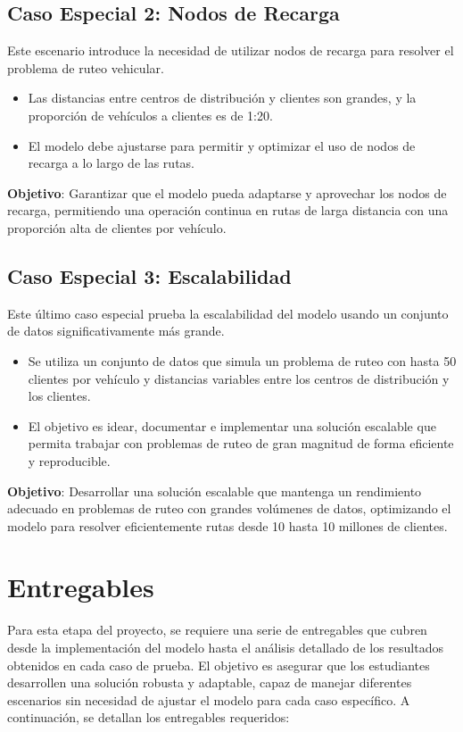 \documentclass[12pt]{article}
\begin{document}
\subsection{Caso Especial 2: Nodos de Recarga}
Este escenario introduce la necesidad de utilizar nodos de recarga para resolver el problema de ruteo vehicular.
\begin{itemize}
    \item Las distancias entre centros de distribución y clientes son grandes, y la proporción de vehículos a clientes es de 1:20.
    \item El modelo debe ajustarse para permitir y optimizar el uso de nodos de recarga a lo largo de las rutas.
\end{itemize}
\textbf{Objetivo}: Garantizar que el modelo pueda adaptarse y aprovechar los nodos de recarga, permitiendo una operación continua en rutas de larga distancia con una proporción alta de clientes por vehículo.

\subsection{Caso Especial 3: Escalabilidad}
Este último caso especial prueba la escalabilidad del modelo usando un conjunto de datos significativamente más grande.
\begin{itemize}
    \item Se utiliza un conjunto de datos que simula un problema de ruteo con hasta 50 clientes por vehículo y distancias variables entre los centros de distribución y los clientes.
    \item El objetivo es idear, documentar e implementar una solución escalable que permita trabajar con problemas de ruteo de gran magnitud de forma eficiente y reproducible.
\end{itemize}
\textbf{Objetivo}: Desarrollar una solución escalable que mantenga un rendimiento adecuado en problemas de ruteo con grandes volúmenes de datos, optimizando el modelo para resolver eficientemente rutas desde 10 hasta 10 millones de clientes.

\bigskip

\section{Entregables}

Para esta etapa del proyecto, se requiere una serie de entregables que cubren desde la implementación del modelo hasta el análisis detallado de los resultados obtenidos en cada caso de prueba. El objetivo es asegurar que los estudiantes desarrollen una solución robusta y adaptable, capaz de manejar diferentes escenarios sin necesidad de ajustar el modelo para cada caso específico. A continuación, se detallan los entregables requeridos:
\end{document}
